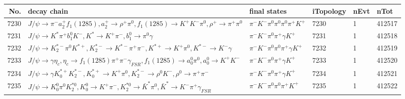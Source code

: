 \begin{table}[htbp] 
\begin{center}
\begin{small}
\begin{tabular}{rlllll}\hline\hline
 No. & decay chain & final states &  iTopology & nEvt & nTot \\\hline
7230&$J/\psi       \rightarrow \pi^{-}        a_{2}^{+}      f_{1}(1285)    , a_{2}^{+}       \rightarrow \rho^{+}      \pi^{0}        , f_{1}(1285)     \rightarrow K^{+}          K^{-}          \pi^{0}        , \rho^{+}       \rightarrow \pi^{+}        \pi^{0}        $&$\pi^{-}        K^{-}          \pi^{0}        \pi^{0}        \pi^{0}        \pi^{+}        K^{+}          $& 7230&    1&412517\\
7231&$J/\psi       \rightarrow K^{*}          \pi^{+}        b_{1}^{0}      K^{-}          , K^{*}           \rightarrow K^{+}          \pi^{-}        , b_{1}^{0}       \rightarrow \pi^{0}        \gamma       $&$\pi^{-}        K^{-}          \pi^{0}        \pi^{+}        \gamma       K^{+}          $& 7231&    1&412518\\
7232&$J/\psi       \rightarrow K_2^{*-}       \pi^{0}        K^{*+}         , K_2^{*-}        \rightarrow K^{*-}         \pi^{+}        \pi^{-}        , K^{*+}          \rightarrow K^{+}          \pi^{0}        , K^{*-}          \rightarrow K^{-}          \gamma       $&$\pi^{-}        K^{-}          \pi^{0}        \pi^{0}        \pi^{+}        \gamma       K^{+}          $& 7232&    1&412519\\
7233&$J/\psi       \rightarrow \gamma       \eta_{c}    , \eta_{c}     \rightarrow f_{1}(1285)    \pi^{+}        \pi^{-}        \gamma_{FSR} , f_{1}(1285)     \rightarrow a_{0}^{0}      \pi^{0}        , a_{0}^{0}       \rightarrow K^{+}          K^{-}          $&$\pi^{-}        K^{-}          \pi^{0}        \pi^{+}        \gamma       K^{+}          $& 7233&    1&412520\\
7234&$J/\psi       \rightarrow \gamma       K_{0}^{*+}     K_2^{*-}       , K_{0}^{*+}      \rightarrow K^{+}          \pi^{0}        , K_2^{*-}        \rightarrow \rho^{0}      K^{-}          , \rho^{0}       \rightarrow \pi^{+}        \pi^{-}        $&$\pi^{-}        K^{-}          \pi^{0}        \pi^{+}        \gamma       K^{+}          $& 7234&    1&412521\\
7235&$J/\psi       \rightarrow K_0^{0}        \pi^{0}        K_2^{*0}       , K_0^{0}         \rightarrow K^{+}          \pi^{-}        , K_2^{*0}        \rightarrow \bar{K}^{*}   \pi^{0}        , \bar{K}^{*}    \rightarrow K^{-}          \pi^{+}        \gamma_{FSR} $&$\pi^{-}        K^{-}          \pi^{0}        \pi^{0}        \pi^{+}        K^{+}          $& 7235&    1&412522\\

\end{tabular}
\end{small}
\end{center}
\end{table}
